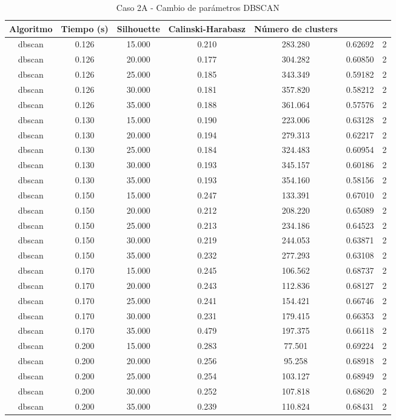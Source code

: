 \begin{table}[H]
\centering
\caption{Caso 2A - Cambio de parámetros DBSCAN}
\label{tab:c2A_dbscan}
\begin{tabular}{ccccccc}
\toprule
 Algoritmo & Tiempo (s) & Silhouette & Calinski-Harabasz & Número de clusters \\
\midrule
dbscan & 0.126 & 15.000 & 0.210 & 283.280 & 0.62692 & 2 \\
dbscan & 0.126 & 20.000 & 0.177 & 304.282 & 0.60850 & 2 \\
dbscan & 0.126 & 25.000 & 0.185 & 343.349 & 0.59182 & 2 \\
dbscan & 0.126 & 30.000 & 0.181 & 357.820 & 0.58212 & 2 \\
dbscan & 0.126 & 35.000 & 0.188 & 361.064 & 0.57576 & 2 \\
dbscan & 0.130 & 15.000 & 0.190 & 223.006 & 0.63128 & 2 \\
dbscan & 0.130 & 20.000 & 0.194 & 279.313 & 0.62217 & 2 \\
dbscan & 0.130 & 25.000 & 0.184 & 324.483 & 0.60954 & 2 \\
dbscan & 0.130 & 30.000 & 0.193 & 345.157 & 0.60186 & 2 \\
dbscan & 0.130 & 35.000 & 0.193 & 354.160 & 0.58156 & 2 \\
dbscan & 0.150 & 15.000 & 0.247 & 133.391 & 0.67010 & 2 \\
dbscan & 0.150 & 20.000 & 0.212 & 208.220 & 0.65089 & 2 \\
dbscan & 0.150 & 25.000 & 0.213 & 234.186 & 0.64523 & 2 \\
dbscan & 0.150 & 30.000 & 0.219 & 244.053 & 0.63871 & 2 \\
dbscan & 0.150 & 35.000 & 0.232 & 277.293 & 0.63108 & 2 \\
dbscan & 0.170 & 15.000 & 0.245 & 106.562 & 0.68737 & 2 \\
dbscan & 0.170 & 20.000 & 0.243 & 112.836 & 0.68127 & 2 \\
dbscan & 0.170 & 25.000 & 0.241 & 154.421 & 0.66746 & 2 \\
dbscan & 0.170 & 30.000 & 0.231 & 179.415 & 0.66353 & 2 \\
dbscan & 0.170 & 35.000 & 0.479 & 197.375 & 0.66118 & 2 \\
dbscan & 0.200 & 15.000 & 0.283 & 77.501 & 0.69224 & 2 \\
dbscan & 0.200 & 20.000 & 0.256 & 95.258 & 0.68918 & 2 \\
dbscan & 0.200 & 25.000 & 0.254 & 103.127 & 0.68949 & 2 \\
dbscan & 0.200 & 30.000 & 0.252 & 107.818 & 0.68620 & 2 \\
dbscan & 0.200 & 35.000 & 0.239 & 110.824 & 0.68431 & 2 \\
\bottomrule
\end{tabular}
\end{table}

